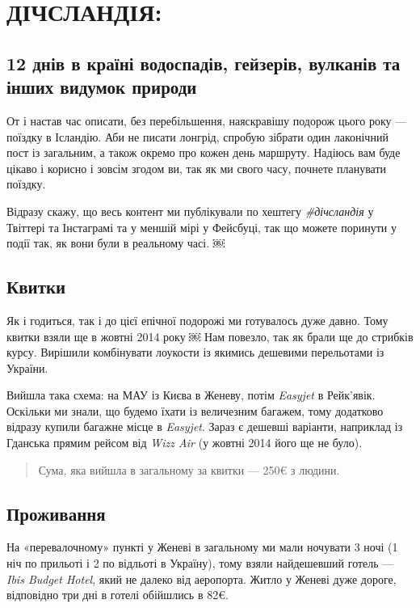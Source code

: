 \section{ДІЧСЛАНДІЯ:}

\subsection{12 днів в країні водоспадів, гейзерів, вулканів та інших
видумок
природи}
От і настав час описати, без перебільшення, наяскравішу подорож цього
року --- поїздку в Ісландію. Аби не писати лонгрід, спробую зібрати один
лаконічний пост із загальним, а також окремо про кожен день маршруту.
Надіюсь вам буде цікаво і корисно і зовсім згодом ви, так як ми свого
часу, почнете планувати поїздку.

Відразу скажу, що весь контент ми публікували по хештегу
\emph{\#дічсландія} у Твіттері та Інстаграмі та у меншій мірі у
Фейсбуці, так що можете поринути у події так, як вони були в реальному
часі. ￼

\subsection{Квитки}

Як і годиться, так і до цієї епічної подорожі ми готувалось дуже давно.
Тому квитки взяли ще в жовтні 2014 року ￼ Нам повезло, так як брали ще
до стрибків курсу. Вирішили комбінувати лоукости із якимись дешевими
перельотами із України.

Вийшла така схема: на МАУ із Києва в Женеву, потім \emph{Easyjet} в
Рейк'явік. Оскільки ми знали, що будемо їхати із величезним багажем,
тому додатково відразу купили багажне місце в \emph{Easyjet}. Зараз є
дешевші варіанти, наприклад із Гданська прямим рейсом від \emph{Wizz
Air} (у жовтні 2014 його ще не було).

\begin{quote}
Сума, яка вийшла в загальному за квитки --- 250\euro{} з людини.
\end{quote}

\subsection{Проживання}

На «перевалочному» пункті у Женеві в загальному ми мали ночувати 3 ночі
(1 ніч по прильоті і 2 по відльоті в Україну), тому взяли найдешевший
готель --- \emph{Ibis Budget Hotel}, який не далеко від аеропорта. Житло
у Женеві дуже дороге, відповідно три дні в готелі обійшлись в 82\euro{}.

